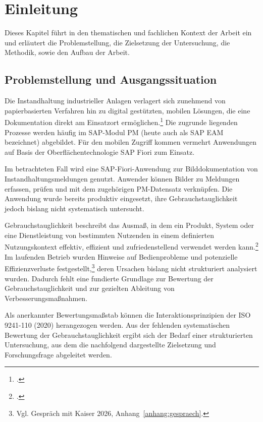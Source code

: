 \chapter{Einleitung}
\label{chapter:kapitel1}

Dieses Kapitel führt in den thematischen und fachlichen Kontext der Arbeit ein und erläutert
die Problemstellung, die Zielsetzung der Untersuchung, die Methodik, sowie den Aufbau der Arbeit.



\section{Problemstellung und Ausgangssituation}
\label{section:problemstellung}
Die Instandhaltung industrieller Anlagen verlagert sich zunehmend von papierbasierten Verfahren hin zu digital gestützten, 
mobilen Lösungen, die eine Dokumentation direkt am Einsatzort ermöglichen.\footcite[Vgl.][S. 291]{eisenmann_von_2023} 
Die zugrunde liegenden Prozesse werden häufig im \ac{SAP}-Modul \ac{PM} (heute auch als SAP \ac{EAM} 
bezeichnet) abgebildet. Für den mobilen Zugriff kommen vermehrt Anwendungen auf Basis der Oberflächentechnologie SAP Fiori zum Einsatz.

Im betrachteten Fall wird eine SAP-Fiori-Anwendung zur Bilddokumentation von Instandhaltungsmeldungen genutzt. Anwender können Bilder 
zu Meldungen erfassen, prüfen und mit dem zugehörigen PM-Datensatz verknüpfen. Die Anwendung wurde bereits produktiv eingesetzt, 
ihre Gebrauchstauglichkeit jedoch bislang nicht systematisch untersucht.

Gebrauchstauglichkeit beschreibt das Ausmaß, in dem ein Produkt, System oder eine Dienstleistung von bestimmten Nutzenden in einem 
definierten Nutzungskontext effektiv, effizient und zufriedenstellend verwendet werden kann.\footcite[Vgl.][Abschnitt~3.1]{DIN_ISO_9241-11:2018}
Im laufenden Betrieb wurden Hinweise auf Bedienprobleme und potenzielle Effizienzverluste festgestellt,\footnote{Vgl. Gespräch mit Kaiser 2026, Anhang~\ref{anhang:gespraech}.} deren Ursachen bislang nicht 
strukturiert analysiert wurden. Dadurch fehlt eine fundierte Grundlage zur Bewertung der Gebrauchstauglichkeit und zur gezielten 
Ableitung von Verbesserungsmaßnahmen.

Als anerkannter Bewertungsmaßstab können die Interaktionsprinzipien der ISO 9241-110 (2020) herangezogen werden. Aus der fehlenden 
systematischen Bewertung der Gebrauchstauglichkeit ergibt sich der Bedarf einer strukturierten Untersuchung, aus dem die nachfolgend 
dargestellte Zielsetzung und Forschungsfrage abgeleitet werden.

